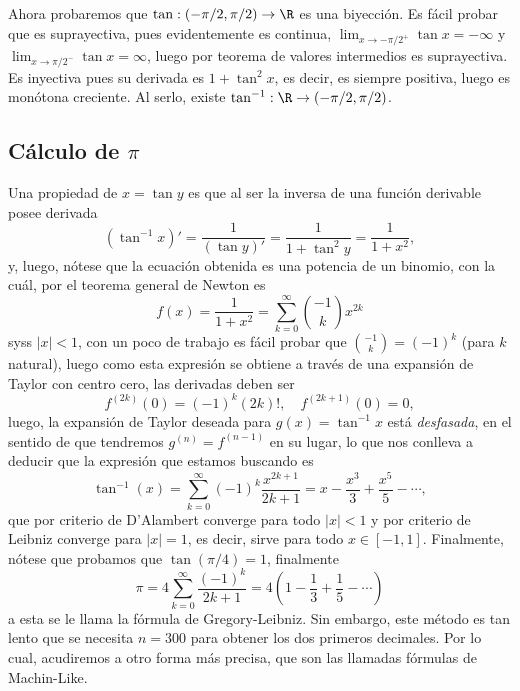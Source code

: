 \documentclass[11pt,oneside,a4paper]{book}
\begin{document}
Ahora probaremos que $\tan:(-\pi/2,\pi/2)\rightarrow\R$ es una biyección. Es fácil probar que es suprayectiva, pues evidentemente es continua, $\lim_{x\to-\pi/2^+}\tan x=-\infty$ y $\lim_{x\to\pi/2^-}\tan x=\infty$, luego por teorema de valores intermedios es suprayectiva. Es inyectiva pues su derivada es $1+\tan^2x$, es decir, es siempre positiva, luego es monótona creciente. Al serlo, existe $\tan^{-1}:\R\rightarrow(-\pi/2,\pi/2)$.

\subsection*{Cálculo de $\pi$}
Una propiedad de $x=\tan y$ es que al ser la inversa de una función derivable posee derivada
$$(\tan^{-1}x)'=\frac{1}{(\tan y)'}=\frac{1}{1+\tan^2y}=\frac{1}{1+x^2},$$
y, luego, nótese que la ecuación obtenida es una potencia de un binomio, con la cuál, por el teorema general de Newton es
$$f(x)=\frac{1}{1+x^2}=\sum_{k=0}^\infty\binom{-1}{k}x^{2k}$$
syss $|x|\lt 1$, con un poco de trabajo es fácil probar que $\binom{-1}{k}=(-1)^k$ (para $k$ natural), luego como esta expresión se obtiene a través de una expansión de Taylor con centro cero, las derivadas deben ser
$$f^{(2k)}(0)=(-1)^k(2k)!,\quad f^{(2k+1)}(0)=0,$$
luego, la expansión de Taylor deseada para $g(x)=\tan^{-1}x$ está \textit{desfasada}, en el sentido de que tendremos $g^{(n)}=f^{(n-1)}$ en su lugar, lo que nos conlleva a deducir que la expresión que estamos buscando es
\begin{equation}\label{eq:arctan-taylor}
\tan^{-1}(x)=\sum_{k=0}^\infty(-1)^k\frac{x^{2k+1}}{2k+1}=x-\frac{x^3}{3}+\frac{x^5}{5}-\cdots,
\end{equation}
que por criterio de D'Alambert converge para todo $|x|\lt 1$ y por criterio de Leibniz converge para $|x|=1$, es decir, sirve para todo $x\in[-1,1]$. Finalmente, nótese que probamos que $\tan(\pi/4)=1$, finalmente
$$\pi=4\sum_{k=0}^\infty\frac{(-1)^k}{2k+1}=4\left(1-\frac{1}{3}+\frac{1}{5}-\cdots\right)$$
a esta se le llama la fórmula de Gregory-Leibniz. Sin embargo, este método es tan lento que se necesita $n=300$ para obtener los dos primeros decimales. Por lo cual, acudiremos a otro forma más precisa, que son las llamadas fórmulas de Machin-Like.
\end{document}
